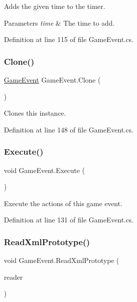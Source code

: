 Adds the given time to the timer. 


\begin{DoxyParams}{Parameters}
{\em time} & The time to add.\\
\hline
\end{DoxyParams}


Definition at line 115 of file Game\+Event.\+cs.

\mbox{\label{class_game_event_a41d51d26400785d060c39f534f98dc75}} 
\subsubsection{\texorpdfstring{Clone()}{Clone()}}
{\footnotesize\ttfamily \hyperlink{class_game_event}{Game\+Event} Game\+Event.\+Clone (\begin{DoxyParamCaption}{ }\end{DoxyParamCaption})}



Clones this instance. 



Definition at line 148 of file Game\+Event.\+cs.

\mbox{\label{class_game_event_ab310e768a6d0603e1c04db54e6ac06ad}} 
\subsubsection{\texorpdfstring{Execute()}{Execute()}}
{\footnotesize\ttfamily void Game\+Event.\+Execute (\begin{DoxyParamCaption}{ }\end{DoxyParamCaption})}



Execute the actions of this game event. 



Definition at line 131 of file Game\+Event.\+cs.

\mbox{\label{class_game_event_a5219d3c4766e76549b4b90926a4e5066}} 
\subsubsection{\texorpdfstring{Read\+Xml\+Prototype()}{ReadXmlPrototype()}}
{\footnotesize\ttfamily void Game\+Event.\+Read\+Xml\+Prototype (\begin{DoxyParamCaption}\item[{Xml\+Reader}]{reader }\end{DoxyParamCaption})}



